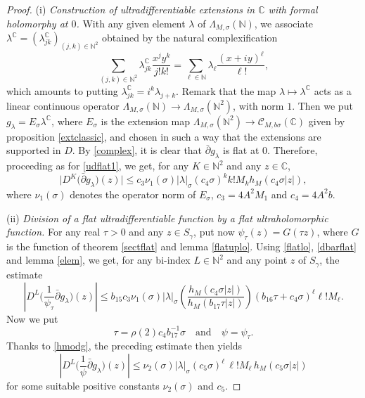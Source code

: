 \documentclass[a4paper]{amsart}
\theoremstyle{plain}
\theoremstyle{definition}
\theoremstyle{remark}
\begin{document}
\begin{proof}
\noindent (i) \textit{Construction of ultradifferentiable extensions in $ \mathbb{C} $ with formal
holomorphy at $ 0 $.}
With any given element $ \lambda $ of $ \Lambda_{M,\sigma}(\mathbb{N}) $, we
associate $ \lambda^\mathbb{C}=(\lambda^\mathbb{C}_{jk})_{(j,k)\in\mathbb{N}^2} $ obtained by the natural complexification
\begin{equation}\label{complex}
\sum_{(j,k)\in\mathbb{N}^2}\lambda^\mathbb{C}_{jk}\frac{x^jy^k}{j!k!}=
\sum_{\ell\in\mathbb{N}}\lambda_\ell\frac{(x+iy)^\ell}{\ell!},
\end{equation}
which amounts to putting $ \lambda^\mathbb{C}_{jk}=i^k\lambda_{j+k} $. Remark that the map
$ \lambda\longmapsto \lambda^\mathbb{C} $ acts as a linear continuous operator $ \Lambda_{M,\sigma}(\mathbb{N})\longrightarrow \Lambda_{M,\sigma}(\mathbb{N}^2) $, with
norm $ 1 $.
Then we put  
$ g_\lambda= E_\sigma \lambda^\mathbb{C} $, where 
$ E_\sigma $ is the extension map $ \Lambda_{M,\sigma}(\mathbb{N}^2)
\longrightarrow\mathcal{C}_{M,b\sigma}(\mathbb{C}) $ given by proposition
\ref{extclassic}, and chosen in such a way that the extensions
are supported in $ D $. 
By \eqref{complex}, it is clear that  
$ \bar\partial g_\lambda $ is flat at $ 0 $. Therefore, proceeding as for
\eqref{udflat1}, we get, for any $ K\in\mathbb{N}^2 $ and any
$ z\in\mathbb{C} $, 
\begin{equation}\label{dbarflat}
\big\vert D^K\big(\bar\partial g_\lambda\big)(z)\big\vert\leq c_3\nu_1(\sigma)\vert \lambda\vert_\sigma (c_4\sigma)^k
k!M_k h_M(c_4\sigma\vert z\vert),
\end{equation}
where $ \nu_1(\sigma) $ denotes
the operator norm of $ E_\sigma $, $ c_3=4A^2M_1 $ and $ c_4=4A^2b $.

\noindent (ii) \textit{Division of a flat ultradifferentiable function by a flat ultraholomorphic function.}
For any real $ \tau>0 $ and any $ z\in S_\gamma $, put now $ \psi_\tau(z)=
G(\tau z) $, where $ G $ is the function of theorem
\ref{sectflat} and lemma \ref{flatuplo}. Using \eqref{flatlo}, \eqref{dbarflat} and
lemma \ref{elem}, we get, for
any bi-index $ L\in\mathbb{N}^2 $ and any point $ z $ of $ S_\gamma $, the estimate
\begin{equation*}
\left\vert D^L\Big(\frac{1}{\psi_\tau}\bar\partial g_\lambda\Big)(z)\right\vert\leq b_{15}c_3\nu_1(\sigma)\vert\lambda\vert_\sigma\left(\frac{h_M(c_4\sigma\vert z\vert)}{h_M(b_{17}\tau\vert z\vert)}\right)(b_{16}\tau+c_4\sigma)^\ell \ell! M_\ell.
\end{equation*}
Now we put
\begin{equation}\label{choose}
\tau=\rho(2)c_4b_{17}^{-1}\sigma\quad\text{and}\quad \psi=\psi_\tau.
\end{equation}
Thanks to \eqref{hmodg}, the preceding
estimate then yields
\begin{equation}\label{quotient}
\left\vert D^L\Big(\frac{1}{\psi}\bar\partial g_\lambda\Big)(z)\right\vert\leq \nu_2(\sigma)\vert \lambda\vert_\sigma (c_5\sigma)^\ell\, \ell!M_\ell\, h_M(c_5\sigma\vert z\vert)
\end{equation}
for some suitable positive constants $ \nu_2(\sigma) $ and $ c_5 $.


\end{proof}
\end{document}
